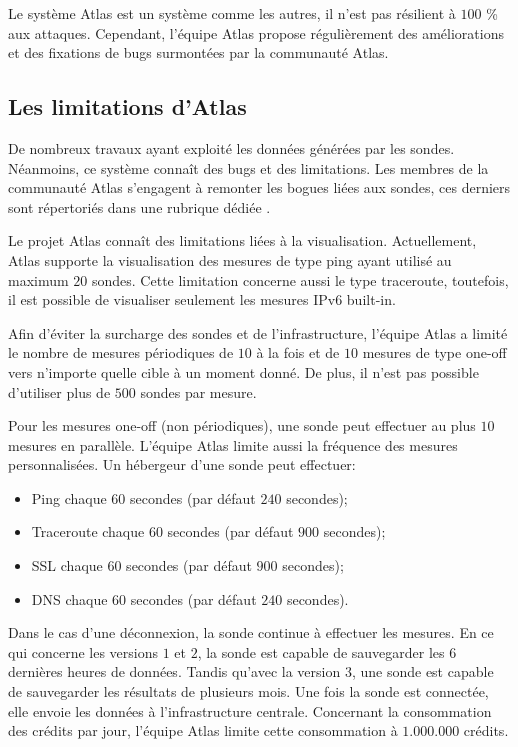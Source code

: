 Le système  Atlas est un système comme les autres, il n'est pas résilient à $100$ \% aux attaques. Cependant, l'équipe  Atlas propose régulièrement des améliorations et des fixations de bugs surmontées par la communauté  Atlas. 


\subsection{Les limitations d'Atlas}


De nombreux travaux ayant exploité les données générées par les sondes. Néanmoins, ce système connaît des bugs et des limitations. Les membres de la communauté  Atlas s'engagent à remonter les bogues liées aux sondes, ces derniers sont répertoriés dans une rubrique dédiée  \cite{bugs-ripe-atlas}.

Le projet Atlas connaît des limitations  liées à la visualisation. Actuellement,  Atlas supporte la visualisation des mesures de type ping ayant utilisé au maximum $20$  sondes. Cette limitation concerne aussi le type traceroute, toutefois,  il est possible de visualiser seulement les mesures IPv6 built-in.

Afin d'éviter la surcharge  des sondes et de l'infrastructure, l'équipe Atlas a limité le nombre de mesures périodiques de $10$ à la fois et de $10$ mesures de type one-off vers n'importe quelle cible à un moment donné. De plus, il n'est pas possible d'utiliser  plus de $500$ sondes par mesure.

Pour les mesures one-off (non périodiques), une sonde peut effectuer au plus $10$ mesures en parallèle. L'équipe Atlas limite aussi la fréquence des mesures personnalisées. Un hébergeur d'une sonde peut effectuer:

\begin{itemize}
	\item Ping chaque $60$ secondes (par défaut  $240$ secondes);
	\item Traceroute chaque $60$ secondes (par défaut  $900$ secondes);
	\item SSL chaque $60$ secondes (par défaut  $900$ secondes);
	\item DNS chaque $60$ secondes (par défaut $240$ secondes).
\end{itemize}

Dans le cas d'une déconnexion, la sonde continue à effectuer les mesures. En ce qui concerne les versions $1$ et $2$, la sonde est capable de sauvegarder les  $6$ dernières heures de données. Tandis qu'avec  la  version $3$, une sonde est capable de sauvegarder les résultats de plusieurs mois. Une fois la sonde est connectée, elle envoie les  données à l'infrastructure centrale.
Concernant la consommation des crédits par jour, l'équipe Atlas limite cette consommation à  $1.000.000$ crédits.


